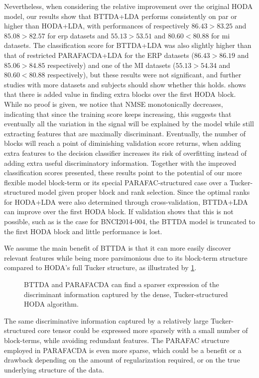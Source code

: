 Nevertheless, when considering the relative improvement over the original
HODA model, our results show that BTTDA+LDA performs consistently on par or
higher than HODA+LDA, with performances of respectively $86.43>83.25$ and
$85.08>82.57$ for \ac{erp} datasets and $55.13>53.51$ and $80.60<80.88$ for
\ac{mi} datasets.
The classification score for BTTDA+LDA was also slightly
higher than that of
restricted PARAFACDA+LDA for the ERP datasets ($86.43>86.19$ and $85.06>84.85$
respectively) and one of the MI datasets ($55.13>54.34$ and $80.60<80.88$
respectively), but these results were not significant, and further studies with
more datasets and subjects should show whether this holds.
 shows that there is added value in finding extra blocks
over the first HODA block.
While no proof is given, we notice that NMSE monotonically decreases, indicating that
since the training score keeps increasing, this suggests that
eventually all the variation in the signal will be explained by the model
while still extracting features that are maximally discriminant.
Eventually, the number of blocks will reach a point of diminishing validation
score returns, when adding extra features to the decision classifier increases
its risk of overfitting instead of adding extra useful discriminatory
information.
Together with the improved classification scores presented, these results
point to the potential of our more flexible model block-term or
its special PARAFAC-structured case over a Tucker-structured model given proper block and
rank selection.
Since the optimal ranks for HODA+LDA were also determined through
cross-validation, BTTDA+LDA can improve over the first HODA block.
If validation shows that this is not possible, such as is the case for
BNCI2014-004, the BTTDA model is truncated to the first HODA block and little
performance is lost.

We assume the main benefit of BTTDA is that it can more easily discover relevant
features while
being more parsimonious due to its block-term structure compared to HODA's full
Tucker structure, as illustrated by \cref{fig:bttda/sparse}.
\begin{figure}
  
  \caption[Sparsity of BTTDA and PARAFACDA]{BTTDA and PARAFACDA can find a
  sparser expression of the discriminant information captured by the dense,
  Tucker-structured HODA algorithm.}
  \label{fig:bttda/sparse}
\end{figure}
The same discriminative information captured by a relatively large
Tucker-structured core tensor could be expressed more sparsely with a small
number of block-terms, while avoiding redundant features.
The PARAFAC structure employed in PARAFACDA is even more sparse, which could be
a benefit or a drawback depending on the amount of regularization required,
or on the true underlying structure of the data.

